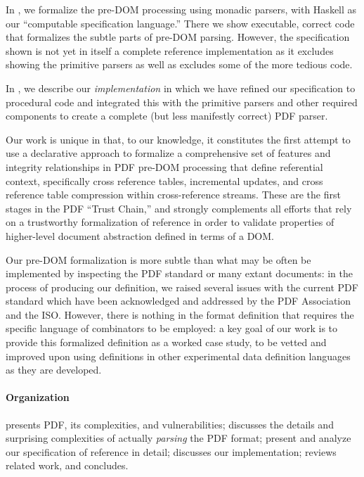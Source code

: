 In , we formalize the pre-DOM processing using
monadic parsers, with Haskell as our ``computable specification language.''
There we show executable, correct code that formalizes the subtle parts of
pre-DOM parsing.  However, the specification shown is not yet in itself a
complete reference implementation as it excludes showing the primitive parsers
as well as excludes some of the more tedious code.

In , we describe our \emph{implementation} in which we
have refined our specification to procedural code and integrated this with
the primitive parsers and other required components to create a
complete (but less manifestly correct) PDF parser.

Our work is unique in that, to our knowledge, it constitutes
the first attempt to use a declarative approach to formalize a comprehensive
set of features and integrity relationships in PDF pre-DOM processing
that define referential context, specifically cross reference tables,
incremental updates, and cross reference table compression within
cross-reference streams.
These are the first stages in the PDF ``Trust Chain,'' and  strongly complements all
efforts that rely on a trustworthy formalization of reference in order
to validate properties of higher-level document abstraction defined in
terms of a DOM.

Our pre-DOM formalization is more subtle than what may be often be
implemented by inspecting the PDF standard or many extant documents:
in the process of producing our definition, we raised several issues
with the current PDF standard which have been acknowledged and
addressed by the PDF Association and the ISO.
%
However, there is nothing in the format definition that requires the
specific language of combinators to be employed: a key goal of our work is
to provide this formalized definition as a worked case study, to be
vetted and improved upon using definitions in other experimental data
definition languages as they are developed.

\paragraph*{Organization}
%
 presents PDF, its complexities, and vulnerabilities;
%
 discusses the details and surprising
complexities of actually \emph{parsing} the PDF format;
%
 present and analyze our
specification of reference in detail;
%
 discusses our implementation;
%
 reviews related work, and %
 concludes.
